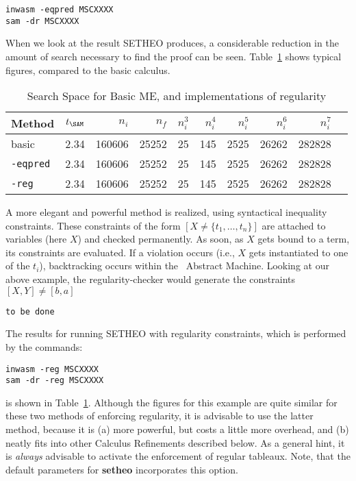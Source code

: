 \begin{center}
\begin{verbatim}
inwasm -eqpred MSCXXXX
sam -dr MSCXXXX
\end{verbatim}
\end{center}

When we look at the result SETHEO produces, a considerable 
reduction in the amount of search necessary to find the proof
can be seen.
Table~\ref{tab:tut2:results.regularity} shows typical figures, compared
to the basic calculus.

\begin{table}[htb]
\begin{center}
\begin{tabular}{|l|r|r||r|r||r|r|r|r|r|}
\hline
Method & $t_{\SAM}$ & $n_i$ & $n_f$ & 
	$n_i^3$ & $n_i^4$ & $n_i^5$ & $n_i^6$ & $n_i^7$ \\
\hline\hline
basic & 2.34 & 160606 & 25252 &
	25 & 145 & 2525 & 26262 & 282828 \\
\hline
{\tt -eqpred} & 2.34 & 160606 & 25252 &
	25 & 145 & 2525 & 26262 & 282828 \\
\hline
{\tt -reg} & 2.34 & 160606 & 25252 &
	25 & 145 & 2525 & 26262 & 282828 \\
\hline\hline
\end{tabular}
\end{center}
\caption{Search Space for Basic ME, and implementations of
regularity}
\label{tab:tut2:results.regularity}
\end{table}


A more elegant and powerful method is realized, using syntactical
inequality constraints. These constraints of the form
$ [ X \not = \{t_1,\ldots,t_n\}] $  are attached to variables (here $X$)
and checked permanently. As soon, as $X$ gets bound to a term,
its constraints are evaluated. If a violation occurs (i.e.,
$X$ gets instantiated to one of the $t_i$), backtracking
occurs within the \SAM\ Abstract Machine.
Looking at our above example, the regularity-checker would
generate the constraints $[ X,Y ] \not = [ b,a ]$

{\tt to be done}

The results for running SETHEO with regularity constraints, which
is performed by the commands:
\begin{center}
\begin{verbatim}
inwasm -reg MSCXXXX
sam -dr -reg MSCXXXX
\end{verbatim}
\end{center}
is shown in Table~\ref{tab:tut2:results.regularity}.
Although the figures for this example are quite similar for these
two methods of enforcing regularity, it is advisable to use the
latter method, because it is (a) more powerful, but costs a little
more overhead, and (b) neatly fits into other Calculus Refinements
described below. As a general hint, it is {\em always\/} advisable to
activate the enforcement of regular tableaux. Note, that the
default parameters for {\bf setheo} incorporates this option.


